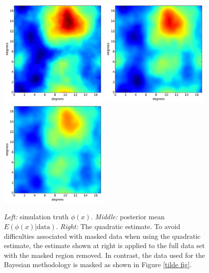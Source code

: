 \documentclass[iop,revtex4,apj,onecolumn]{emulateapj}
\begin{document}
\begin{figure}
\begin{center}
{\includegraphics[height=2.1in]{figure5a.pdf}}%
{\includegraphics[height=2.1in]{figure5b.pdf}}%
{\includegraphics[height=2.1in]{figure5c.pdf}}%
\end{center}
\caption{\label{phix fig}
{\em Left:} simulation truth $\phi(x)$. {\em Middle:} posterior mean $E(\phi(x)|\text{data})$. {\em Right:} The quadratic estimate. To avoid difficulties associated with masked data when using the quadratic estimate,  the estimate shown at right is applied to the full data set with the masked region removed. In contrast, the data used for the Bayesian methodology is masked as shown in Figure \ref{tilde fig}.}
\end{figure}
\end{document}
